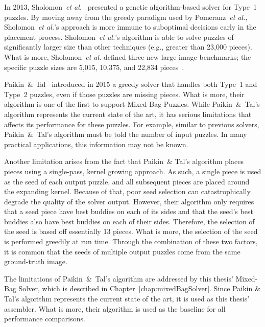 In 2013, Sholomon~\textit{et al.}~\cite{sholomon2013} presented a genetic algorithm-based solver for Type~1 puzzles.  By moving away from the greedy paradigm used by Pomeranz~\textit{et al.}, Sholomon~\textit{et al.}'s approach is more immune to suboptimal decisions early in the placement process. Sholomon~\textit{et al.}'s algorithm is able to solve puzzles of significantly larger size than other techniques (e.g., greater than 23,000 pieces).  What is more, Sholomon~\textit{et al.} defined three new large image benchmarks; the specific puzzle sizes are 5,015, 10,375, and 22,834 pieces~\cite{sholomonBenchmarkImages}.

Paikin~\& Tal~\cite{paikin2015} introduced in 2015 a greedy solver that handles both Type~1 and Type~2 puzzles, even if those puzzles are missing pieces.  What is more, their algorithm is one of the first to support Mixed-Bag Puzzles.  While Paikin~\&~Tal's algorithm represents the current state of the art, it has serious limitations that affects its performance for these puzzles.  For example, similar to previous solvers, Paikin~\&~Tal's algorithm must be told the number of input puzzles.  In many practical applications, this information may not be known.

Another limitation arises from the fact that Paikin~\& Tal's algorithm places pieces using a single-pass, kernel growing approach.  As such, a single piece is used as the seed of each output puzzle, and all subsequent pieces are placed around the expanding kernel.  Because of that, poor seed selection can catastrophically degrade the quality of the solver output.  However, their algorithm only requires that a seed piece have best buddies on each of its sides and that the seed's best buddies also have best buddies on each of their sides.  Therefore, the selection of the seed is based off essentially 13 pieces.  What is more, the selection of the seed is performed greedily at run time.  Through the combination of these two factors, it is common that the seeds of multiple output puzzles come from the same ground-truth image.

The limitations of Paikin~\&~Tal's algorithm are addressed by this thesis' Mixed-Bag Solver, which is described in Chapter~\ref{chap:mixedBagSolver}.  Since Paikin \&  Tal's algorithm represents the current state of the art, it is used as this thesis' assembler.  What is more, their algorithm is used as the baseline for all performance comparisons. 